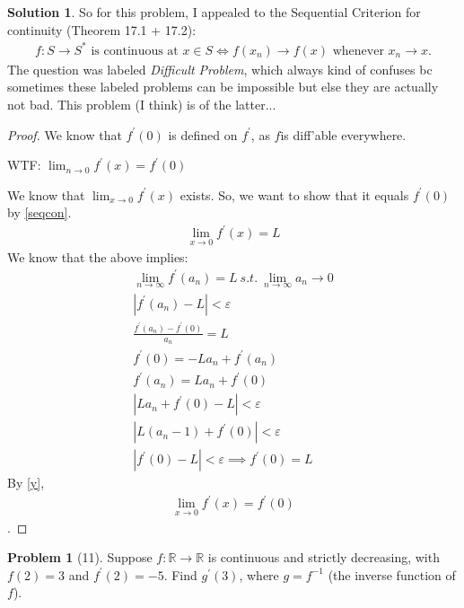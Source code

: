 \documentclass[12pt]{article}
\theoremstyle{definition} %
\newtheorem{solution}{Solution}
\newtheorem{problem}{Problem}
\theoremstyle{plain} %
\begin{document}
\begin{solution}
   So for this problem, I appealed to the Sequential Criterion for continuity (Theorem 17.1 + 17.2): 
  \begin{align}
    f:S\to S^{*} \text{ is continuous at } x\in S \iff  f(x_{n})\to f(x) \text{ whenever } x_{n}\to x. \label{seqcon}
  \end{align}  The question was labeled \emph{Difficult Problem}, which always kind of confuses bc sometimes these labeled problems can be impossible but else they are actually not bad. This problem (I think) is of the latter...
   \begin{proof}
    \noindent

    We know that $f^\prime (0)$ is defined on $f^\prime $, as $f$is diff'able everywhere.
    
    WTF: $\lim_{n \to 0}f^\prime (x)=f^\prime (0) $ 

    We know that $\lim_{x \to 0}f^\prime (x) $ exists. So, we want to show that it equals $f^\prime (0)$ by \autoref{seqcon}.
    \begin{align}
       \lim_{x \to 0} f^\prime (x)=L 
    \end{align}
    We know that the above implies:
    \begin{align}
        \lim_{n \to \infty} f^\prime (a_{n})=L \ s.t. \ \lim_{n \to \infty} a_{n}\to 0 \\[10pt] 
        \left\vert f^\prime (a_{n})-L \right\vert <\varepsilon \\[10pt] 
        \frac{f^\prime (a_{n})-f^\prime (0)}{a_{n}}=L \\[10pt] 
        f^\prime (0) = -La_{n}+f^\prime (a_{n}) \\[10pt] 
        f^\prime (a_{n}) = La_{n}+f^\prime (0) \\[10pt] 
        \left\vert La_{n}+f^\prime (0)-L \right\vert <\varepsilon \\[10pt] 
        \left\vert L(a_{n}-1)+f^\prime (0) \right\vert < \varepsilon \\[10pt] 
        \left\vert f^\prime (0) -L \right\vert < \varepsilon \implies f^\prime (0) = L \label{y}
    \end{align}
    By \autoref{y}, 
    \begin{align}
        \lim_{x \to 0} f^\prime (x)=f^\prime (0)
    \end{align}.
   \end{proof}     

\end{solution}
\begin{problem}[11]
    Suppose $f: \mathbb{{R}}\to \mathbb{{R}}$ is continuous and strictly decreasing, with $f(2)=3$ and $f^\prime (2)=-5$. Find $g^\prime (3)$, where $g=f^{-1}$ (the inverse function of $f$).     
\end{problem}
\end{document}
